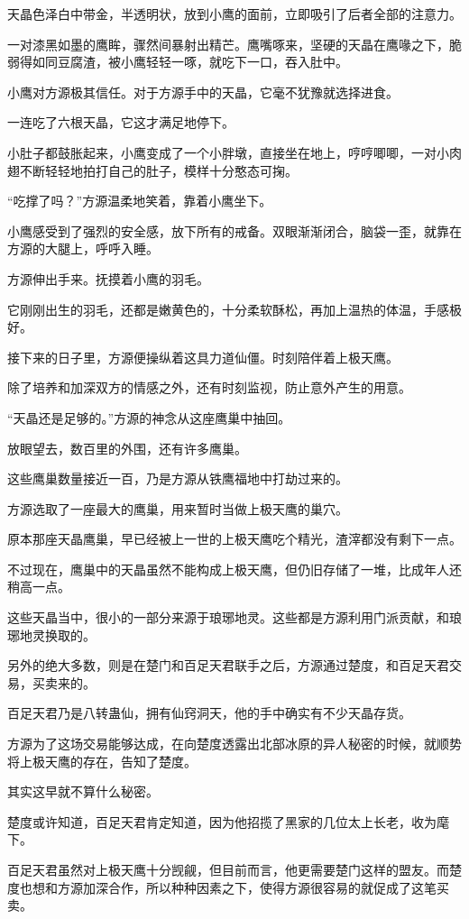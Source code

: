 \begin{this_body}
天晶色泽白中带金，半透明状，放到小鹰的面前，立即吸引了后者全部的注意力。

一对漆黑如墨的鹰眸，骤然间暴射出精芒。鹰嘴啄来，坚硬的天晶在鹰喙之下，脆弱得如同豆腐渣，被小鹰轻轻一啄，就吃下一口，吞入肚中。

小鹰对方源极其信任。对于方源手中的天晶，它毫不犹豫就选择进食。

一连吃了六根天晶，它这才满足地停下。

小肚子都鼓胀起来，小鹰变成了一个小胖墩，直接坐在地上，哼哼唧唧，一对小肉翅不断轻轻地拍打自己的肚子，模样十分憨态可掬。

“吃撑了吗？”方源温柔地笑着，靠着小鹰坐下。

小鹰感受到了强烈的安全感，放下所有的戒备。双眼渐渐闭合，脑袋一歪，就靠在方源的大腿上，呼呼入睡。

方源伸出手来。抚摸着小鹰的羽毛。

它刚刚出生的羽毛，还都是嫩黄色的，十分柔软酥松，再加上温热的体温，手感极好。

接下来的日子里，方源便操纵着这具力道仙僵。时刻陪伴着上极天鹰。

除了培养和加深双方的情感之外，还有时刻监视，防止意外产生的用意。

“天晶还是足够的。”方源的神念从这座鹰巢中抽回。

放眼望去，数百里的外围，还有许多鹰巢。

这些鹰巢数量接近一百，乃是方源从铁鹰福地中打劫过来的。

方源选取了一座最大的鹰巢，用来暂时当做上极天鹰的巢穴。

原本那座天晶鹰巢，早已经被上一世的上极天鹰吃个精光，渣滓都没有剩下一点。

不过现在，鹰巢中的天晶虽然不能构成上极天鹰，但仍旧存储了一堆，比成年人还稍高一点。

这些天晶当中，很小的一部分来源于琅琊地灵。这些都是方源利用门派贡献，和琅琊地灵换取的。

另外的绝大多数，则是在楚门和百足天君联手之后，方源通过楚度，和百足天君交易，买卖来的。

百足天君乃是八转蛊仙，拥有仙窍洞天，他的手中确实有不少天晶存货。

方源为了这场交易能够达成，在向楚度透露出北部冰原的异人秘密的时候，就顺势将上极天鹰的存在，告知了楚度。

其实这早就不算什么秘密。

楚度或许知道，百足天君肯定知道，因为他招揽了黑家的几位太上长老，收为麾下。

百足天君虽然对上极天鹰十分觊觎，但目前而言，他更需要楚门这样的盟友。而楚度也想和方源加深合作，所以种种因素之下，使得方源很容易的就促成了这笔买卖。


\end{this_body}
